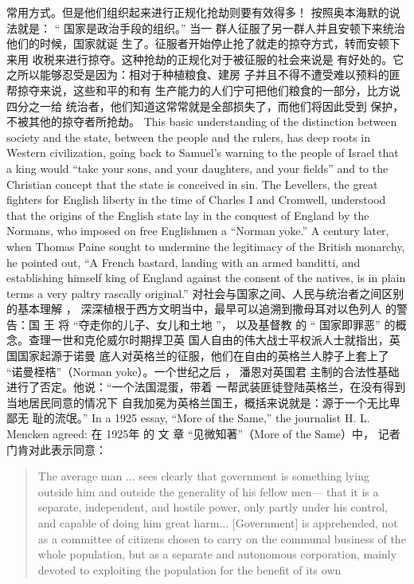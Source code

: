 \begin{paracol}{2}
常用方式。但是他们组织起来进行正规化抢劫则要有效得多！
按照奥本海默的说法就是： “ 国家是政治手段的组织。” 当一
群人征服了另一群人并且安顿下来统治他们的时候，国家就诞
生了。征服者开始停止抢了就走的掠夺方式，转而安顿下来用
收税来进行掠夺。这种抢劫的正规化对于被征服的社会来说是
有好处的。它之所以能够忍受是因为：相对于种植粮食、建房
子并且不得不遭受难以预料的匪帮掠夺来说，这些和平的和有
生产能力的人们宁可把他们粮食的一部分，比方说四分之一给
统治者，他们知道这常常就是全部损失了，而他们将因此受到
保护，不被其他的掠夺者所抢劫。
\switchcolumn*
This basic understanding of the distinction between society
and the state, between the people and the rulers, has deep roots
in Western civilization, going back to Samuel's warning to the
people of Israel that a king would ``take your sons, and your
daughters, and your fields'' and to the Christian concept that
the state is conceived in sin. The Levellers, the great fighters for
English liberty in the time of Charles I and Cromwell, understood that the origins of the English state lay in the conquest of
England by the Normans, who imposed on free Englishmen a
``Norman yoke.'' A century later, when Thomas Paine sought to
undermine the legitimacy of the British monarchy, he pointed
out, ``A French bastard, landing with an armed banditti, and establishing himself king of England against the consent of the
natives, is in plain terms a very paltry rascally original.''
\switchcolumn
对社会与国家之间、人民与统治者之间区别的基本理解 ，
深深植根于西方文明当中，最早可以追溯到撒母耳对以色列人
的警告：国 王 将 “夺走你的儿子、女儿和土地 ”， 以及基督教
的 “ 国家即罪恶” 的概念。查理一世和克伦威尔时期捍卫英
国人自由的伟大战士平权派人士就指出，英国国家起源于诺曼
底人对英格兰的征服，他们在自由的英格兰人脖子上套上了
“诺曼桎梏”（Norman  yoke）。一个世纪之后 ， 潘恩对英国君
主制的合法性基础进行了否定。他说：“一个法国混蛋，带着
一帮武装匪徒登陆英格兰，在没有得到当地居民同意的情况下
自我加冕为英格兰国王，概括来说就是：源于一个无比卑鄙无
耻的流氓。”
\switchcolumn*
In a 1925 essay, ``More of the Same,'' the journalist H. L.
Mencken agreed:
\switchcolumn
在 1925年 的 文 章 “见微知著”（More  of the Same）中，
记者门肯对此表示同意：
\switchcolumn*
\begin{quote}
The average man $\ldots$ sees clearly that government is something
lying outside him and outside the generality of his fellow men---
that it is a separate, independent, and hostile power, only partly
under his control, and capable of doing him great harm$\ldots$
[Government] is apprehended, not as a committee of citizens chosen to carry on the communal business of the whole population, but as a separate and autonomous corporation, mainly devoted to exploiting the population for the benefit of its own

\end{quote}
\end{paracol}
